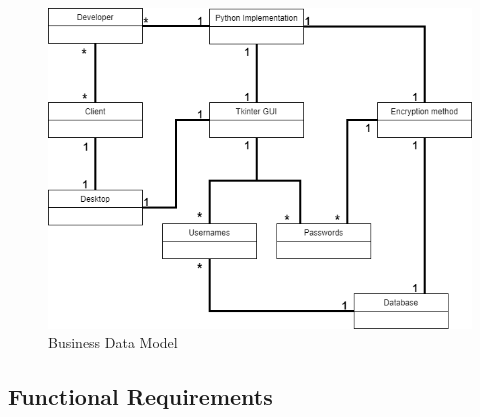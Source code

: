 \documentclass[12pt, titlepage]{article}
\begin{document}
\begin{figure}[H]
\includegraphics[scale=0.5]{Images/BusinessModel.png}
\caption{Business Data Model}
\end{figure}

\subsection{Functional Requirements}
\end{document}
